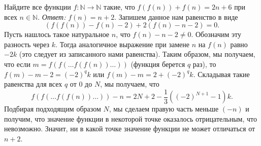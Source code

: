 \problem
Найдите все функции $f \colon \mathbb{N} \to \mathbb{N}$ такие, что
$f(f(n)) + f(n) = 2 n + 6$ при всех $n \in \mathbb{N}$.
\solution
\emph{Ответ:} $f(n) = n + 2$.
Запишем данное нам равенство в виде
\[
    (f(f(n)) - f(n) - 2) + 2 (f(n) - n - 2) = 0
.\]
Пусть нашлось такое натуральное $n$, что $f(n) - n - 2 \neq 0$.
Обозначим эту разность через $k$.
Тогда аналогичное выражение при замене $n$ на $f(n)$ равно $- 2 k$
(это следует из записанного нами равенства).
Таким образом, мы получаем, что если $m = f(f(\ldots f(f(n)) \ldots))$
(функция берется $q$ раз), то $f(m) - m - 2 = (-2)^q k$ или
$f(m) - m = 2 + (-2)^q k$.
Складывая такие равенства для всех $q$ от $0$ до $N$, мы получаем, что
\[
    f(f(\ldots f(f(n)) \ldots)) - n
=
    2 N + 2 - \frac{1}{3} ((-2)^{N+1} - 1) k
.\]
Подбирая подходящим образом $N$, мы сделаем правую часть меньше $(-n)$ и
получим, что значение функции в некоторой точке оказалось отрицательным, что
невозможно.
Значит, ни в какой точке значение функции не может отличаться от $n + 2$.
\endproblem
